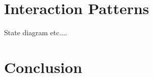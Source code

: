 \documentclass[10pt,a4paper,oneside]{scrartcl}
\begin{document}
\section{Interaction Patterns}
State diagram etc....



\section{Conclusion}




\printbibliography
\end{document}
